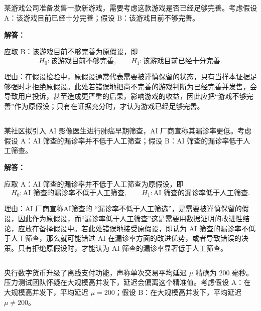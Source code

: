 \documentclass[12pt,a4paper]{article}
\begin{document}
\subsection{}

某游戏公司准备发售一款新游戏，需要考虑这款游戏是否已经足够完善。考虑假设 A：该游戏目前已经十分完善；假设 B：该游戏目前不够完善。

\begin{answerbox}
\textbf{解答：}

应取 B：该游戏目前不够完善为原假设，即
\[
H_0:\text{该游戏目前不够完善},\qquad
H_1:\text{该游戏目前已经十分完善}.
\]

理由：在假设检验中，原假设通常代表需要被谨慎保留的状态，只有当样本证据足够强时才拒绝原假设。此处若错误地把尚不完善的游戏判断为已经完善并发售，会导致用户投诉，甚至造成更严重的后果，影响游戏的收益，因此应把“游戏不够完善”作为原假设；只有在证据充分时，才认为游戏已经足够完善。

\end{answerbox}

\subsection{}

某社区拟引入 AI 影像医生进行肺癌早期筛查，AI 厂商宣称其漏诊率更低。考虑假设 A：AI 筛查的漏诊率并不低于人工筛查；假设 B：AI 筛查的漏诊率低于人工筛查。

\begin{answerbox}
\textbf{解答：}

应取 A：AI 筛查的漏诊率并不低于人工筛查为原假设，即
\[
H_0:\text{AI 筛查的漏诊率不低于人工筛查},\qquad
H_1:\text{AI 筛查的漏诊率低于人工筛查}.
\]

理由：AI 厂商宣称AI筛查的 “漏诊率不低于人工筛选”，是需要被谨慎保留的假设，因此作为原假设，而“漏诊率低于人工筛查”这是需要用数据证明的改进性结论，应放在备择假设中。若此处错误地接受原假设，即认为 AI 筛查的漏诊率不低于人工筛查，那么就可能错过 AI 在漏诊率方面的改进优势，或者导致错误的决策。只有拒绝原假设时，才能认为 AI 筛查的漏诊率显著低于人工筛查。

\end{answerbox}

\subsection{}

央行数字货币升级了离线支付功能，声称单次交易平均延迟 $\mu$ 精确为 $200$ 毫秒。压力测试团队怀疑在大规模高并发下，延迟会偏离这个精准值。考虑假设 A：在大规模高并发下，平均延迟 $\mu = 200$；假设 B：在大规模高并发下，平均延迟 $\mu \neq 200$。
\end{document}
